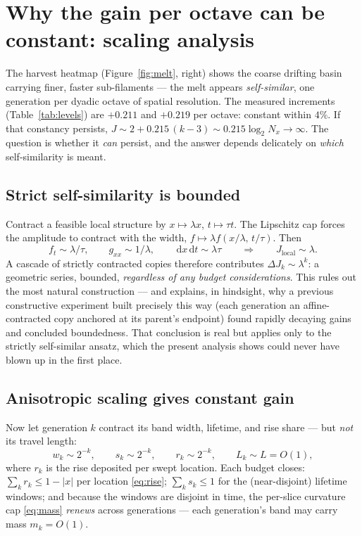 \documentclass[11pt]{article}
\newcommand{\dd}{\,\mathrm{d}}
\begin{document}
\section{Why the gain per octave can be constant: scaling analysis}
\label{sec:scaling}

The harvest heatmap (Figure~\ref{fig:melt}, right) shows the coarse drifting
basin carrying finer, faster sub-filaments --- the melt appears
\emph{self-similar}, one generation per dyadic octave of spatial
resolution. The measured increments (Table~\ref{tab:levels}) are
$+0.211$ and $+0.219$ per octave: constant within $4\%$. If that constancy
persists, $J\sim 2+0.215\,(k-3)\sim 0.215\log_2 N_x\to\infty$. The question
is whether it \emph{can} persist, and the answer depends delicately on
\emph{which} self-similarity is meant.

\subsection{Strict self-similarity is bounded}

Contract a feasible local structure by $x\mapsto\lambda x$,
$t\mapsto\tau t$. The Lipschitz cap forces the amplitude to contract with
the width, $f\mapsto\lambda f(x/\lambda,\,t/\tau)$. Then
\[
f_t\sim\lambda/\tau,\qquad g_{xx}\sim 1/\lambda,\qquad
\dd x\dd t\sim\lambda\tau
\qquad\Longrightarrow\qquad J_{\mathrm{local}}\sim\lambda .
\]
A cascade of strictly contracted copies therefore contributes
$\Delta J_k\sim\lambda^k$: a geometric series, bounded, \emph{regardless of
any budget considerations}. This rules out the most natural construction
--- and explains, in hindsight, why a previous constructive experiment
built precisely this way (each generation an affine-contracted copy
anchored at its parent's endpoint) found rapidly decaying gains and
concluded boundedness. That conclusion is real but applies only to the
strictly self-similar ansatz, which the present analysis shows could never
have blown up in the first place.

\subsection{Anisotropic scaling gives constant gain}
\label{sec:aniso}

Now let generation $k$ contract its band width, lifetime, and rise share
--- but \emph{not} its travel length:
\[
w_k\sim 2^{-k},\qquad s_k\sim 2^{-k},\qquad r_k\sim 2^{-k},
\qquad L_k\sim L=O(1),
\]
where $r_k$ is the rise deposited per swept location. Each budget closes:
$\sum_k r_k\le 1-|x|$ per location \eqref{eq:rise}; $\sum_k s_k\le 1$ for
the (near-disjoint) lifetime windows; and because the windows are disjoint
in time, the per-slice curvature cap \eqref{eq:mass} \emph{renews} across
generations --- each generation's band may carry mass $m_k=O(1)$.
\end{document}
